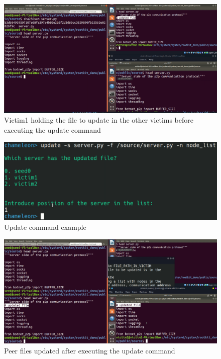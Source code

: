 \documentclass[11pt, a4paper,twoside]{tesi_upf}
\begin{document}
\begin{figure}[h]
\centering
\includegraphics[width=\linewidth]{images/victim1-update.png}
    \caption{Victim1 holding the file to update in the other victims before executing the update command}
    \label{fig:victim-command}
\end{figure}
\begin{figure}[H]
\centering
\includegraphics[width=\linewidth]{images/update-command.png}
    \caption{Update command example}
    \label{fig:victim-command}
\end{figure}
\begin{figure}[h]
\centering
\includegraphics[width=\linewidth]{images/updated-files.png}
    \caption{Peer files updated after executing the update command}
    \label{fig:victim-command}
\end{figure}
\end{document}
